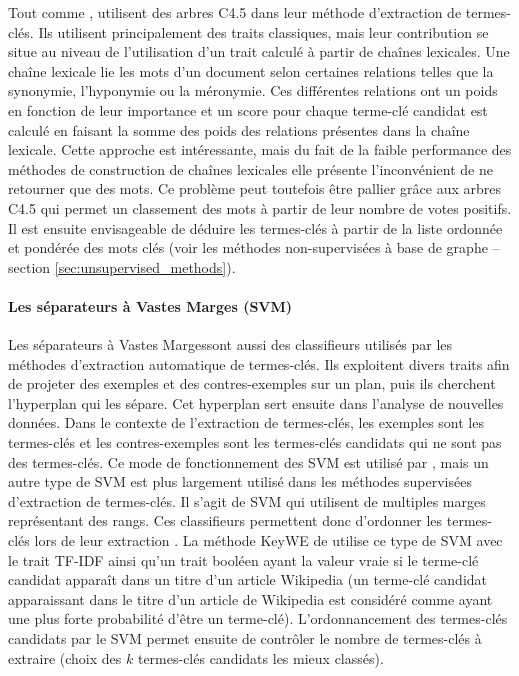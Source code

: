         Tout comme ,
         utilisent des arbres C4.5 dans leur
        méthode d'extraction de termes-clés. Ils utilisent principalement des
        traits classiques, mais leur contribution se situe au niveau de
        l'utilisation d'un trait calculé à partir de chaînes lexicales. Une
        chaîne lexicale lie les mots d'un document selon certaines relations
        telles que la synonymie, l'hyponymie ou la méronymie. Ces différentes
        relations ont un poids en fonction de leur importance et un score pour
        chaque terme-clé candidat est calculé en faisant la somme des poids
        des relations présentes dans la chaîne lexicale. Cette approche est
        intéressante, mais du fait de la faible performance des méthodes de
        construction de chaînes lexicales elle présente l'inconvénient de ne
        retourner que des mots. Ce problème peut toutefois être pallier grâce
        aux arbres C4.5 qui permet un classement des mots à partir de leur
        nombre de votes positifs. Il est ensuite envisageable de déduire les
        termes-clés à partir de la liste ordonnée et pondérée des mots clés
        (voir les méthodes non-supervisées à base de graphe -- section
        \ref{sec:unsupervised_methods}).

      \paragraph{Les séparateurs à Vastes Marges (SVM)}
      \label{subsubsec:main-state_of_the_art-automatic_keyphrase_extraction-supervised_keyphrase_extraction-svms}
        Les séparateurs à Vastes Margessont aussi des classifieurs utilisés par les méthodes d'extraction
        automatique de termes-clés. Ils exploitent divers traits afin de
        projeter des exemples et des contres-exemples sur un plan, puis ils
        cherchent l'hyperplan qui les sépare. Cet hyperplan sert ensuite dans
        l'analyse de nouvelles données. Dans le contexte de l'extraction de
        termes-clés, les exemples sont les termes-clés et les contres-exemples
        sont les termes-clés candidats qui ne sont pas des termes-clés. Ce
        mode de fonctionnement des SVM est utilisé par ,
        mais un autre type de SVM est plus largement utilisé dans les méthodes
        supervisées d'extraction de termes-clés. Il s'agit de SVM qui
        utilisent de multiples marges représentant des rangs. Ces classifieurs
        permettent donc d'ordonner les termes-clés lors de leur extraction
        \cite{herbrich1999svm, joachims2006linearsvm, jiang2009rankingsvm}.
        La méthode KeyWE de  utilise ce type de SVM
        avec le trait TF-IDF ainsi qu'un trait booléen ayant la valeur vraie
        si le terme-clé candidat apparaît dans un titre d'un article Wikipedia
        (un terme-clé candidat apparaissant dans le titre d'un article de
        Wikipedia est considéré comme ayant une plus forte probabilité d'être
        un terme-clé). L'ordonnancement des termes-clés candidats par le SVM
        permet ensuite de contrôler le nombre de termes-clés à extraire (choix
        des $k$ termes-clés candidats les mieux classés).

